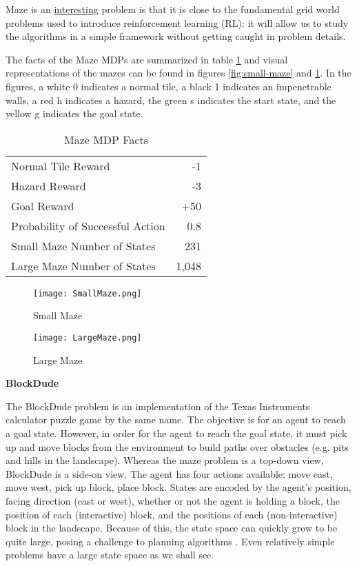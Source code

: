 \documentclass{article}
\begin{document}
Maze is an \underline{interesting} problem is that it is close to the fundamental grid world problems
used to introduce reinforcement learning (RL): it will allow us to study the algorithms
in a simple framework without getting caught in problem details.

The facts of the Maze MDPs are summarized in table \ref{table:maze-facts} and visual
representations of the mazes can be found in figures \ref{fig:small-maze} and
\ref{fig:large-maze}. In the figures, a white 0 indicates a normal tile, a black 1
indicates an impenetrable walls, a red h indicates a hazard, the green s indicates the
start state, and the yellow g indicates the goal state.

\begin{table}
    \centering
    \caption{Maze MDP Facts}
    \label{table:maze-facts}
    \begin{tabular}{lr}
        \toprule
         Normal Tile Reward & -1 \\
         Hazard Reward & -3 \\
         Goal Reward & +50 \\
         Probability of Successful Action & 0.8 \\
         Small Maze Number of States & 231 \\
         Large Maze Number of States & 1,048 \\
        \bottomrule
        \end{tabular}
\end{table}

\begin{figure}
    \centering
    \begin{minipage}{0.5\textwidth}
        \centering
        \texttt{[image: SmallMaze.png]}
        \caption{Small Maze}
        \label{fig:small-maze}
    \end{minipage}\hfill
    \begin{minipage}{0.5\textwidth}
        \centering
        \texttt{[image: LargeMaze.png]}
        \caption{Large Maze}
        \label{fig:large-maze}
    \end{minipage}
\end{figure}

\textbf{BlockDude}

The BlockDude problem is an implementation of the Texas Instruments calculator puzzle
game by the same name. The objective is for an agent to reach a goal state. However, in
order for the agent to reach the goal state, it must pick up and move blocks from the
environment to build paths over obstacles (e.g. pits and hills in the landscape). Whereas
the maze problem is a top-down view, BlockDude is a side-on view. The agent has four
actions available: move east, move west, pick up block, place block. States are encoded
by the agent's position, facing direction (east or west), whether or not the agent is
holding a block, the position of each (interactive) block, and the positions of each
(non-interactive) block in the landscape. Because of this, the state space can quickly
grow to be quite large, posing a challenge to planning algorithms \cite{block_dude_desc}.
Even relatively simple problems have a large state space as we shall see.
\end{document}
